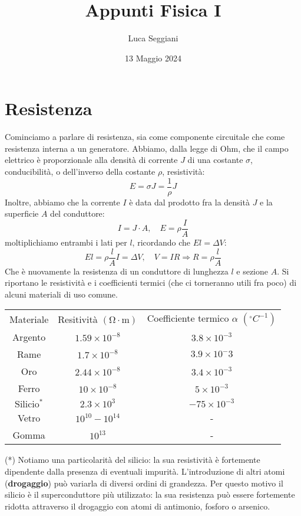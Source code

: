 \documentclass[a4paper,12pt]{article}
\title{Appunti Fisica I}
\author{Luca Seggiani}
\date{13 Maggio 2024}
\begin{document}
\maketitle
\section{Resistenza}
Cominciamo a parlare di resistenza, sia come componente circuitale che come resistenza interna a un generatore. Abbiamo, dalla legge di Ohm, che il campo elettrico è proporzionale alla densità di corrente $J$ di una costante $\sigma$, conducibilità, o
dell'inverso della costante $\rho$, resistività:
$$ E = \sigma J = \frac{1}{\rho}J $$
Inoltre, abbiamo che la corrente $I$ è data dal prodotto fra la densità $J$ e la superficie $A$ del conduttore:
$$ I = J\cdot A, \quad E = \rho \frac{I}{A} $$
moltiplichiamo entrambi i lati per $l$, ricordando che $El = \Delta V$:
$$ El = \rho \frac{l}{A} I = \Delta V, \quad V = IR \Rightarrow R = \rho \frac{l}{A}$$
Che è nuovamente la resistenza di un conduttore di lunghezza $l$ e sezione $A$.
Si riportano le resistività e i coefficienti termici (che ci torneranno utili fra poco) di alcuni materiali di uso comune.
\begin{center}
\begin{tabular}{|c|c|c|}
  Materiale & Resitività $\left(\mathrm{\Omega \cdot m}\right)$ & Coefficiente termico $\alpha$ $\left( {}^\circ C^{-1} \right)$\\
  Argento & $1.59 \times 10^{-8}$ & $3.8 \times 10^{-3}$ \\
  Rame & $1.7 \times 10^{-8}$ & $3.9 \times 10^-3$ \\
  Oro & $2.44 \times 10^{-8}$ & $3.4 \times 10^{-3}$ \\
  Ferro & $10 \times 10^{-8}$ & $5 \times 10^{-3}$ \\
  $\mathrm{Silicio^*}$ & $2.3 \times 10^{3}$ & $-75 \times 10^{-3}$ \\
  Vetro & $ 10^{10} - 10^{14} $ & - \\
  Gomma & $10^{13}$ & - \\
\end{tabular}
\end{center}
(*) Notiamo una particolarità del silicio: la sua resistività è fortemente dipendente dalla presenza di eventuali impurità. L'introduzione di altri atomi (\textbf{drogaggio}) può variarla di diversi ordini di grandezza. Per questo
motivo il silicio è il superconduttore più utilizzato: la sua resistenza può essere fortemente ridotta attraverso il drogaggio con atomi di antimonio, fosforo o arsenico.
\end{document}
